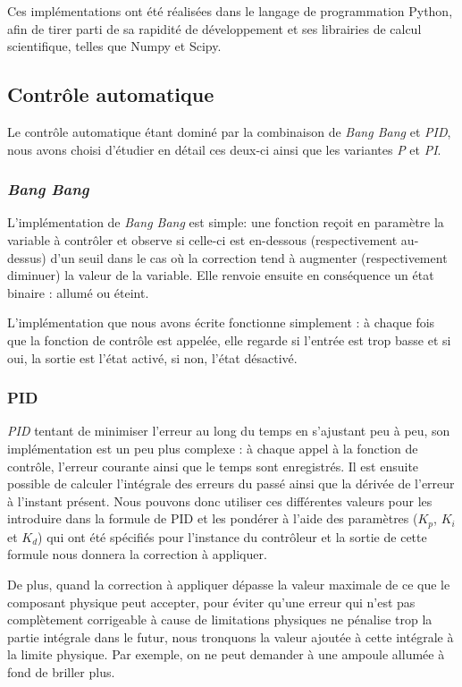 \documentclass[a4paper,10pt]{report}
\begin{document}
Ces implémentations ont été réalisées dans le langage de programmation Python, afin de tirer parti de sa rapidité de développement et ses librairies de calcul scientifique, telles que Numpy et Scipy.

\subsection{Contrôle automatique}
\label{sec:contr-implem}
Le contrôle automatique étant dominé par la combinaison de \textit{Bang Bang} et \textit{PID}, nous avons choisi d'étudier en détail ces deux-ci ainsi que les variantes \textit{P} et \textit{PI}.

\subsubsection{\emph{Bang Bang}}

L'implémentation de \emph{Bang Bang} est simple: une fonction reçoit en paramètre la variable à contrôler et observe si celle-ci est en-dessous (respectivement au-dessus) d'un seuil dans le cas où la correction tend à augmenter (respectivement diminuer) la valeur de la variable. Elle renvoie ensuite en conséquence un état binaire : allumé ou éteint.

L'implémentation que nous avons écrite fonctionne simplement : à chaque fois que la fonction de contrôle est appelée, elle regarde si l'entrée est trop basse et si oui, la sortie est l'état activé, si non, l'état désactivé.

\subsubsection{PID}

\emph{PID} tentant de minimiser l'erreur au long du temps en s'ajustant peu à peu, son implémentation est un peu plus complexe : à chaque appel à la fonction de contrôle, l'erreur courante ainsi que le temps sont enregistrés.
Il est ensuite possible de calculer l'intégrale des erreurs du passé ainsi que la dérivée de l'erreur à l'instant présent.
Nous pouvons donc utiliser ces différentes valeurs pour les introduire dans la formule de PID et les pondérer à l'aide des paramètres ($K_p$, $K_i$ et $K_d$) qui ont été spécifiés pour l'instance du contrôleur et la sortie de cette formule nous donnera la correction à appliquer.

De plus, quand la correction à appliquer dépasse la valeur maximale de ce que le composant physique peut accepter, pour éviter qu'une erreur qui n'est pas complètement corrigeable à cause de limitations physiques ne pénalise trop la partie intégrale dans le futur, nous tronquons la valeur ajoutée à cette intégrale à la limite physique. Par exemple, on ne peut demander à une ampoule allumée à fond de briller plus.
\end{document}

